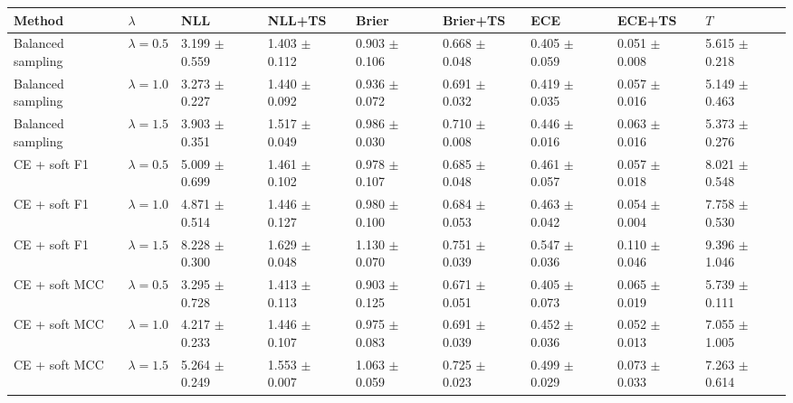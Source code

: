 \begin{tabular}{lllllllll}
\toprule
Method & $\lambda$ & NLL & NLL+TS & Brier & Brier+TS & ECE & ECE+TS & $T$\\
\midrule
Balanced sampling & $\lambda=0.5$ & \num{3.199} $\pm$ \num{0.559} & \num{1.403} $\pm$ \num{0.112} & \num{0.903} $\pm$ \num{0.106} & \num{0.668} $\pm$ \num{0.048} & \num{0.405} $\pm$ \num{0.059} & \num{0.051} $\pm$ \num{0.008} & \num{5.615} $\pm$ \num{0.218}\\
Balanced sampling & $\lambda=1.0$ & \num{3.273} $\pm$ \num{0.227} & \num{1.440} $\pm$ \num{0.092} & \num{0.936} $\pm$ \num{0.072} & \num{0.691} $\pm$ \num{0.032} & \num{0.419} $\pm$ \num{0.035} & \num{0.057} $\pm$ \num{0.016} & \num{5.149} $\pm$ \num{0.463}\\
Balanced sampling & $\lambda=1.5$ & \num{3.903} $\pm$ \num{0.351} & \num{1.517} $\pm$ \num{0.049} & \num{0.986} $\pm$ \num{0.030} & \num{0.710} $\pm$ \num{0.008} & \num{0.446} $\pm$ \num{0.016} & \num{0.063} $\pm$ \num{0.016} & \num{5.373} $\pm$ \num{0.276}\\
CE + soft F1 & $\lambda=0.5$ & \num{5.009} $\pm$ \num{0.699} & \num{1.461} $\pm$ \num{0.102} & \num{0.978} $\pm$ \num{0.107} & \num{0.685} $\pm$ \num{0.048} & \num{0.461} $\pm$ \num{0.057} & \num{0.057} $\pm$ \num{0.018} & \num{8.021} $\pm$ \num{0.548}\\
CE + soft F1 & $\lambda=1.0$ & \num{4.871} $\pm$ \num{0.514} & \num{1.446} $\pm$ \num{0.127} & \num{0.980} $\pm$ \num{0.100} & \num{0.684} $\pm$ \num{0.053} & \num{0.463} $\pm$ \num{0.042} & \num{0.054} $\pm$ \num{0.004} & \num{7.758} $\pm$ \num{0.530}\\
CE + soft F1 & $\lambda=1.5$ & \num{8.228} $\pm$ \num{0.300} & \num{1.629} $\pm$ \num{0.048} & \num{1.130} $\pm$ \num{0.070} & \num{0.751} $\pm$ \num{0.039} & \num{0.547} $\pm$ \num{0.036} & \num{0.110} $\pm$ \num{0.046} & \num{9.396} $\pm$ \num{1.046}\\
CE + soft MCC & $\lambda=0.5$ & \num{3.295} $\pm$ \num{0.728} & \num{1.413} $\pm$ \num{0.113} & \num{0.903} $\pm$ \num{0.125} & \num{0.671} $\pm$ \num{0.051} & \num{0.405} $\pm$ \num{0.073} & \num{0.065} $\pm$ \num{0.019} & \num{5.739} $\pm$ \num{0.111}\\
CE + soft MCC & $\lambda=1.0$ & \num{4.217} $\pm$ \num{0.233} & \num{1.446} $\pm$ \num{0.107} & \num{0.975} $\pm$ \num{0.083} & \num{0.691} $\pm$ \num{0.039} & \num{0.452} $\pm$ \num{0.036} & \num{0.052} $\pm$ \num{0.013} & \num{7.055} $\pm$ \num{1.005}\\
CE + soft MCC & $\lambda=1.5$ & \num{5.264} $\pm$ \num{0.249} & \num{1.553} $\pm$ \num{0.007} & \num{1.063} $\pm$ \num{0.059} & \num{0.725} $\pm$ \num{0.023} & \num{0.499} $\pm$ \num{0.029} & \num{0.073} $\pm$ \num{0.033} & \num{7.263} $\pm$ \num{0.614}\\

\end{tabular}
